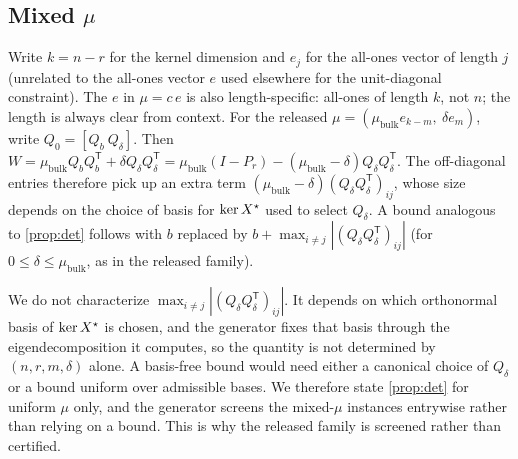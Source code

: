 \subsection{Mixed $\mu$}
Write $k=n-r$ for the kernel dimension and $e_j$ for the all-ones vector of
length $j$ (unrelated to the all-ones vector $e$ used elsewhere for the
unit-diagonal constraint). The $e$ in $\mu=c\,e$ is also length-specific:
all-ones of length $k$, not $n$; the length is always clear from context. For the released
$\mu=(\mu_{\mathrm{bulk}}e_{k-m},\ \delta e_m)$, write
$Q_0=[Q_b\ Q_\delta]$. Then
$W=\mu_{\mathrm{bulk}}Q_bQ_b^{\mathsf T}+\delta Q_\delta Q_\delta^{\mathsf T}
=\mu_{\mathrm{bulk}}(I-P_r)-(\mu_{\mathrm{bulk}}-\delta)Q_\delta Q_\delta^{\mathsf T}$.
The off-diagonal entries therefore pick up an extra term
$(\mu_{\mathrm{bulk}}-\delta)(Q_\delta Q_\delta^{\mathsf T})_{ij}$, whose size
depends on the choice of basis for $\ker X^\star$ used to select $Q_\delta$. A
bound analogous to \cref{prop:det} follows with $b$ replaced by
$b+\max_{i\ne j}|(Q_\delta Q_\delta^{\mathsf T})_{ij}|$ (for
$0\le\delta\le\mu_{\mathrm{bulk}}$, as in the released family).

\begin{remark}[Open]
We do not characterize $\max_{i\ne j}|(Q_\delta Q_\delta^{\mathsf T})_{ij}|$.
It depends on which orthonormal basis of $\ker X^\star$ is chosen, and the
generator fixes that basis through the eigendecomposition it computes, so the
quantity is not determined by $(n,r,m,\delta)$ alone. A basis-free bound would
need either a canonical choice of $Q_\delta$ or a bound uniform over
admissible bases. We therefore state \cref{prop:det} for uniform $\mu$ only,
and the generator screens the mixed-$\mu$ instances entrywise rather than
relying on a bound. This is why the released family is screened rather than
certified.
\end{remark}
